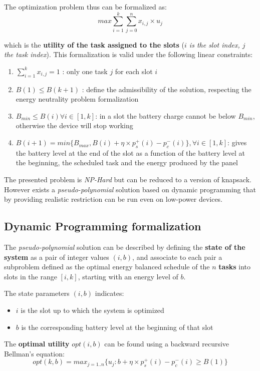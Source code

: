\documentclass[10pt,a4paper]{report}
\theoremstyle{definition}
\begin{document}
The optimization problem thus can be formalized as:
\begin{equation}
	max \sum_{i=1}^{k} \sum_{j=0}^{n}x_{i,j}\times u_{j}
\end{equation}

which is the \textbf{utility of the task assigned to the slots} (\textit{$i$ is the slot index, $j$ the task index}). This formalization is valid under the following linear constraints:
\begin{enumerate}
	\item 
	$\sum_{i=1}^{k} x_{i,j}=1$ : only one task $j$ for each slot $i$
	\item 
	$B(1) \leq B(k+1)$ : define the admissibility of the solution, respecting the energy neutrality problem formalization
	\item 
	$B_{min} \leq B(i) \forall i \in [1,k]$: in a slot the battery charge cannot be below $B_{min}$, otherwise the device will stop working
	\item 
	$B(i+1) = min\{B_{max}, B(i)+\eta \times p_{s}^{+}(i) - p_{c}^{-}(i)\}, \forall i \in [1,k]$:  gives the
	battery level at the end of the slot as a function of the battery level at the beginning, the scheduled task and the energy produced by the panel
\end{enumerate}

The presented problem is \textit{NP-Hard} but can be reduced to a version of knapsack. However exists a \textit{pseudo-polynomial} solution based on dynamic programming that by providing realistic restriction can be run even on low-power devices.
\subsection{Dynamic Programming formalization}\label{sec:dynamic-programming-formalization}
The \textit{pseudo-polynomial} solution can be described by defining the \textbf{state of the system} as a pair of integer values $(i, b)$, and associate to each pair a
subproblem defined as the optimal energy balanced schedule
of the $n$ \textbf{tasks} into slots in the range $[i, k]$, starting with an energy level of $b$.

The state parameters $(i,b)$ indicates:
\begin{itemize}
	\item 
	$i$ is the slot up to which the system is optimized
	\item 
	$b$ is the corresponding battery level at the beginning of that slot

\end{itemize}
	The \textbf{optimal utility} $opt(i,b)$ can be found using a backward recursive Bellman's equation:
\begin{equation}
		opt(k,b) = max_{j=1..n} \{u_{j} : b + \eta \times p_{s}^{+}(i) - p_{c}^{-}(i) \geq B(1)\}
\end{equation}
\end{document}
